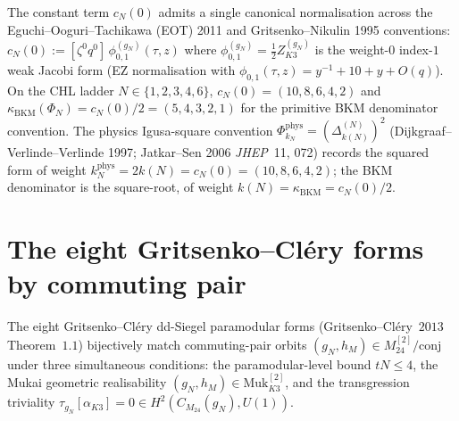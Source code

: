 \begin{remark}
\label{rem:k3e-two-conventions-cN}
The constant term $c_N(0)$ admits a single canonical normalisation across the Eguchi--Ooguri--Tachikawa (EOT) 2011 and Gritsenko--Nikulin 1995 conventions: $c_N(0) := [\zeta^0 q^0]\, \phi^{(g_N)}_{0,1}(\tau, z)$ where $\phi^{(g_N)}_{0, 1} = \tfrac{1}{2} Z^{(g_N)}_{K3}$ is the weight-$0$ index-$1$ weak Jacobi form (EZ normalisation with $\phi_{0,1}(\tau, z) = y^{-1} + 10 + y + O(q)$). On the CHL ladder $N \in \{1, 2, 3, 4, 6\}$, $c_N(0) = (10, 8, 6, 4, 2)$ and $\kappa_{\mathrm{BKM}}(\Phi_N) = c_N(0)/2 = (5, 4, 3, 2, 1)$ for the primitive BKM denominator convention. The physics Igusa-square convention $\Phi^{\mathrm{phys}}_{k_N} = (\Delta_{k(N)}^{(N)})^2$ (Dijkgraaf--Verlinde--Verlinde 1997; Jatkar--Sen 2006 \emph{JHEP}~11, 072) records the squared form of weight $k_N^{\mathrm{phys}} = 2 k(N) = c_N(0) = (10, 8, 6, 4, 2)$; the BKM denominator is the square-root, of weight $k(N)=\kappa_{\mathrm{BKM}}=c_N(0)/2$.
\end{remark}

\section{The eight Gritsenko--Cl\'ery forms by commuting pair}
\label{sec:k3e-eight-form-commuting-pair}

The eight Gritsenko--Cl\'ery dd-Siegel paramodular forms (Gritsenko--Cl\'ery~$2013$ Theorem~$1.1$) bijectively match commuting-pair orbits $(g_N, h_M) \in M_{24}^{[2]}/\mathrm{conj}$ under three simultaneous conditions: the paramodular-level bound $tN \leq 4$, the Mukai geometric realisability $(g_N, h_M) \in \mathrm{Muk}^{[2]}_{K3}$, and the transgression triviality $\tau_{g_N}[\alpha_{K3}] = 0 \in H^2(C_{M_{24}}(g_N), U(1))$.

